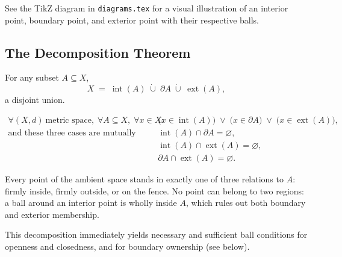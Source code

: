 \begin{remark*}[Diagram]
See the TikZ diagram in \texttt{diagrams.tex} for a visual illustration
of an interior point, boundary point, and exterior point with their
respective balls.
\end{remark*}

\subsection{The Decomposition Theorem}
\label{sec:ibe-decomposition}

\begin{theorem}
\label{thm:ibe-decomp}
For any subset $A \subseteq X$,
\[
  X
  \;=\;
  \operatorname{int}(A)
  \;\dot{\cup}\;
  \partial A
  \;\dot{\cup}\;
  \operatorname{ext}(A),
\]
a disjoint union.
\end{theorem}

\begin{remark*}
\begin{align*}
\forall (X,d)\ \text{metric space},\;
\forall A \subseteq X,\;
\forall x \in X:\quad
&\bigl(x \in \operatorname{int}(A)\bigr)
\;\lor\;
\bigl(x \in \partial A\bigr)
\;\lor\;
\bigl(x \in \operatorname{ext}(A)\bigr), \\[4pt]
\text{and these three cases are mutually exclusive:}\quad
&\operatorname{int}(A) \cap \partial A = \varnothing, \\
&\operatorname{int}(A) \cap \operatorname{ext}(A) = \varnothing, \\
&\partial A \cap \operatorname{ext}(A) = \varnothing.
\end{align*}
\end{remark*}

\begin{remark*}[Intuition]
Every point of the ambient space stands in exactly one of three
relations to $A$: firmly inside, firmly outside, or on the fence.
No point can belong to two regions: a ball around an interior point is
wholly inside $A$, which rules out both boundary and exterior membership.
\end{remark*}

\begin{remark*}[Consequence]
This decomposition immediately yields necessary and sufficient ball
conditions for openness and closedness, and for boundary ownership
(see below).
\end{remark*}

